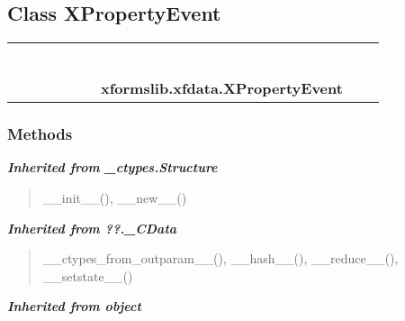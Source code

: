 \subsection{Class XPropertyEvent}

    \label{xformslib:xfdata:XPropertyEvent}
\begin{tabular}{cccccccccc}
\multicolumn{2}{r}{\settowidth{\BCL}{object}\multirow{2}{\BCL}{object}}
&&
&&
&&
  \\\cline{3-3}
  &&\multicolumn{1}{c|}{}
&&
&&
&&
  \\
\multicolumn{4}{r}{\settowidth{\BCL}{??.\_CData}\multirow{2}{\BCL}{??.\_CData}}
&&
&&
  \\\cline{5-5}
  &&&&\multicolumn{1}{c|}{}
&&
&&
  \\
\multicolumn{6}{r}{\settowidth{\BCL}{\_ctypes.Structure}\multirow{2}{\BCL}{\_ctypes.Structure}}
&&
  \\\cline{7-7}
  &&&&&&\multicolumn{1}{c|}{}
&&
  \\
&&&&&&\multicolumn{2}{l}{\textbf{xformslib.xfdata.XPropertyEvent}}
\end{tabular}



  \subsubsection{Methods}


\large{\textbf{\textit{Inherited from \_ctypes.Structure}}}

\begin{quote}
\_\_init\_\_(), \_\_new\_\_()
\end{quote}

\large{\textbf{\textit{Inherited from ??.\_CData}}}

\begin{quote}
\_\_ctypes\_from\_outparam\_\_(), \_\_hash\_\_(), \_\_reduce\_\_(), \_\_setstate\_\_()
\end{quote}

\large{\textbf{\textit{Inherited from object}}}

